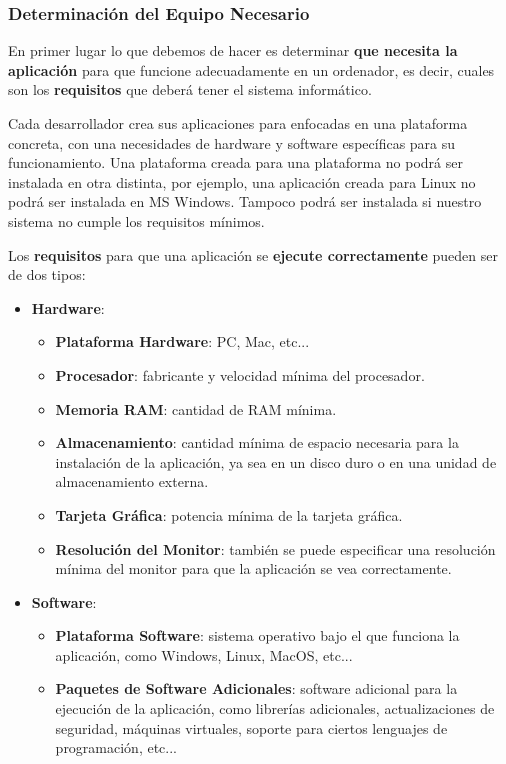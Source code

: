 \subsubsection{Determinación del Equipo Necesario}
En primer lugar lo que debemos de hacer es determinar \textbf{que necesita la aplicación} para que funcione adecuadamente en un ordenador, es decir, cuales son los \textbf{requisitos} que deberá tener el sistema informático.

Cada desarrollador crea sus aplicaciones para enfocadas en una plataforma concreta, con una necesidades de hardware y software específicas para su funcionamiento. Una plataforma creada para una plataforma no podrá ser instalada en otra distinta, por ejemplo, una aplicación creada para Linux no podrá ser instalada en MS Windows. Tampoco podrá ser instalada si nuestro sistema no cumple los requisitos mínimos.

Los \textbf{requisitos} para que una aplicación se \textbf{ejecute correctamente} pueden ser de dos tipos:

\begin{itemize}
    \item \textbf{Hardware}:
    \begin{itemize}
        \item \textbf{Plataforma Hardware}: PC, Mac, etc...
        \item \textbf{Procesador}: fabricante y velocidad mínima del procesador.
        \item \textbf{Memoria RAM}: cantidad de RAM mínima.
        \item \textbf{Almacenamiento}: cantidad mínima de espacio necesaria para la instalación de la aplicación, ya sea en un disco duro o en una unidad de almacenamiento externa.
        \item \textbf{Tarjeta Gráfica}: potencia mínima de la tarjeta gráfica.
        \item \textbf{Resolución del Monitor}: también se puede especificar una resolución mínima del monitor para que la aplicación se vea correctamente.
        \end{itemize}

        \item \textbf{Software}:
        \begin{itemize}
            \item \textbf{Plataforma Software}: sistema operativo bajo el que funciona la aplicación, como Windows, Linux, MacOS, etc...
            \item \textbf{Paquetes de Software Adicionales}: software adicional para la ejecución de la aplicación, como librerías adicionales, actualizaciones de seguridad, máquinas virtuales, soporte para ciertos lenguajes de programación, etc...
        \end{itemize}
\end{itemize}

